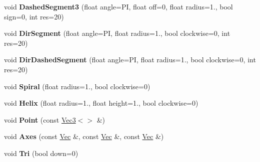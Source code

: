 \begin{DoxyCompactItemize}
\item 
\hypertarget{namespacevsr_1_1_g_l_1_1_glyph_ab7cee4ec3462cf2b811488ef9ced5a2a}{void {\bfseries Dashed\-Segment3} (float angle=P\-I, float off=0, float radius=1., bool sign=0, int res=20)}\label{namespacevsr_1_1_g_l_1_1_glyph_ab7cee4ec3462cf2b811488ef9ced5a2a}

\item 
\hypertarget{namespacevsr_1_1_g_l_1_1_glyph_a7dd7b4686de9a07ffaa8dab40e03654a}{void {\bfseries Dir\-Segment} (float angle=P\-I, float radius=1., bool clockwise=0, int res=20)}\label{namespacevsr_1_1_g_l_1_1_glyph_a7dd7b4686de9a07ffaa8dab40e03654a}

\item 
\hypertarget{namespacevsr_1_1_g_l_1_1_glyph_a70598fa068b0bbed9a2311785e862ada}{void {\bfseries Dir\-Dashed\-Segment} (float angle=P\-I, float radius=1., bool clockwise=0, int res=20)}\label{namespacevsr_1_1_g_l_1_1_glyph_a70598fa068b0bbed9a2311785e862ada}

\item 
\hypertarget{namespacevsr_1_1_g_l_1_1_glyph_a8874a855121d7dbeaf57fd3adc12b6b7}{void {\bfseries Spiral} (float radius=1., bool clockwise=0)}\label{namespacevsr_1_1_g_l_1_1_glyph_a8874a855121d7dbeaf57fd3adc12b6b7}

\item 
\hypertarget{namespacevsr_1_1_g_l_1_1_glyph_aae905a373951eed4c7980a3a75977e9f}{void {\bfseries Helix} (float radius=1., float height=1., bool clockwise=0)}\label{namespacevsr_1_1_g_l_1_1_glyph_aae905a373951eed4c7980a3a75977e9f}

\item 
\hypertarget{namespacevsr_1_1_g_l_1_1_glyph_ada0baded131e7d658a449489a593d3f5}{void {\bfseries Point} (const \hyperlink{classvsr_1_1_vec3}{Vec3}$<$$>$ \&)}\label{namespacevsr_1_1_g_l_1_1_glyph_ada0baded131e7d658a449489a593d3f5}

\item 
\hypertarget{namespacevsr_1_1_g_l_1_1_glyph_ae307afab7267fc688832a8c87da18988}{void {\bfseries Axes} (const \hyperlink{namespacevsr_a0d061c30ac198a710a1b92dd8b343273}{Vec} \&, const \hyperlink{namespacevsr_a0d061c30ac198a710a1b92dd8b343273}{Vec} \&, const \hyperlink{namespacevsr_a0d061c30ac198a710a1b92dd8b343273}{Vec} \&)}\label{namespacevsr_1_1_g_l_1_1_glyph_ae307afab7267fc688832a8c87da18988}

\item 
\hypertarget{namespacevsr_1_1_g_l_1_1_glyph_a06e4ce1348f4cafe91642c4e57d85730}{void {\bfseries Tri} (bool down=0)}\label{namespacevsr_1_1_g_l_1_1_glyph_a06e4ce1348f4cafe91642c4e57d85730}


\end{DoxyCompactItemize}
